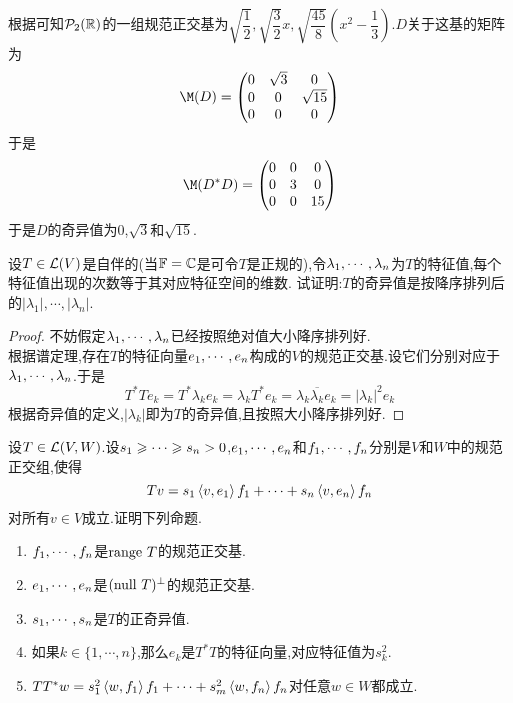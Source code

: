 \documentclass{ctexart}
\begin{document}
\begin{solution}
    根据可知$\mathcal{P}_2(\mathbb{R})$的一组规范正交基为$\sqrt{\dfrac12},\sqrt{\dfrac32}x,\sqrt{\dfrac{45}{8}}\left(x^2-\dfrac13\right)$.$D$关于这基的矩阵为
    \[\M(D)=\begin{pmatrix}
        0&\sqrt{3}&0\\
        0&0&\sqrt{15}\\
        0&0&0
    \end{pmatrix}\]
    于是
    \[\M(D^*D)=\begin{pmatrix}
        0&0&0\\0&3&0\\0&0&15
    \end{pmatrix}\]
    于是$D$的奇异值为$0$,$\sqrt{3}$和$\sqrt{15}$.
\end{solution}
\begin{problem}[7.]
    设$T\in\mathcal{L}(V)$是自伴的(当$\mathbb{F}=\mathbb{C}$是可令$T$是正规的),令${\lambda}_1,\cdots,{\lambda}_{n}$为$T$的特征值,每个特征值出现的次数等于其对应特征空间的维数.%
    试证明:$T$的奇异值是按降序排列后的$|\lambda_1|,\cdots,|\lambda_n|$.
\end{problem}
\begin{proof}
    不妨假定${\lambda}_1,\cdots,{\lambda}_{n}$已经按照绝对值大小降序排列好.\\
    根据谱定理,存在$T$的特征向量${e}_1,\cdots,{e}_{n}$构成的$V$的规范正交基.设它们分别对应于${\lambda}_1,\cdots,{\lambda}_{n}$.于是
    \[T^*Te_k=T^*\lambda_ke_k=\lambda_kT^*e_k=\lambda_k\overline{\lambda_k}e_k=|\lambda_k|^2e_k\]
    根据奇异值的定义,$|\lambda_k|$即为$T$的奇异值,且按照大小降序排列好.
\end{proof}
\begin{problem}[8.]
    设$T\in\mathcal{L}(V,W)$.设${s}_1\geqslant\cdots\geqslant{s}_{n}>0$,${e}_1,\cdots,{e}_{n}$和${f}_1,\cdots,{f}_{n}$分别是$V$和$W$中的规范正交组,使得
    \[Tv=s_1\left\langle{v},{e_1}\right\rangle f_1+\cdots+s_n\left\langle{v},{e_n}\right\rangle f_n\]
    对所有$v\in V$成立.证明下列命题.
    \begin{enumerate}[label=\tbf{(\arabic*)}]
        \item ${f}_1,\cdots,{f}_{n}$是$\text{range } T$的规范正交基.
        \item ${e}_1,\cdots,{e}_{n}$是$(\text{null } T)^\bot$的规范正交基.
        \item ${s}_1,\cdots,{s}_{n}$是$T$的正奇异值.
        \item 如果$k\in\{1,\cdots,n\}$,那么$e_k$是$T^*T$的特征向量,对应特征值为$s_k^2$.
        \item $TT^*w=s_1^2\left\langle{w},{f_1}\right\rangle f_1+\cdots+s_m^2\left\langle{w},{f_n}\right\rangle f_n$对任意$w\in W$都成立.
    \end{enumerate}
\end{problem}
\end{document}
